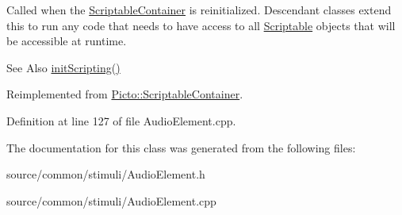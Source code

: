 Called when the \hyperlink{class_picto_1_1_scriptable_container}{Scriptable\-Container} is reinitialized. Descendant classes extend this to run any code that needs to have access to all \hyperlink{class_picto_1_1_scriptable}{Scriptable} objects that will be accessible at runtime. 

\begin{DoxySeeAlso}{See Also}
\hyperlink{class_picto_1_1_scriptable_container_ab3d900d7a5403b8795b0edb54e50a750}{init\-Scripting()} 
\end{DoxySeeAlso}


Reimplemented from \hyperlink{class_picto_1_1_scriptable_container_acabb0f86283aefd4e247f076b56504cd}{Picto\-::\-Scriptable\-Container}.



Definition at line 127 of file Audio\-Element.\-cpp.



The documentation for this class was generated from the following files\-:\begin{DoxyCompactItemize}
\item 
source/common/stimuli/Audio\-Element.\-h\item 
source/common/stimuli/Audio\-Element.\-cpp\end{DoxyCompactItemize}
